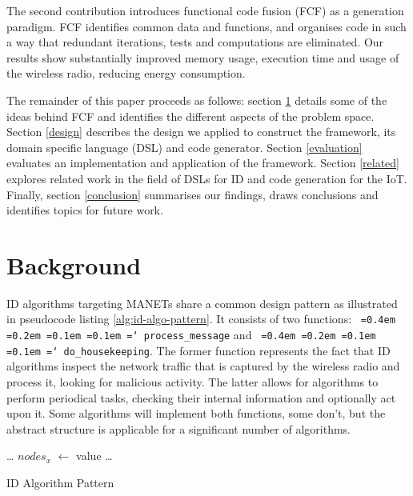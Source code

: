 \documentclass[conference]{IEEEtran}
\newcommand*\justify{%
  \fontdimen2\font=0.4em%
  \fontdimen3\font=0.2em%
  \fontdimen4\font=0.1em%
  \fontdimen7\font=0.1em%
  \hyphenchar\font=`\-%
}
\newcommand{\ttt}[1]{\texttt{\justify{#1}}}
\newcommand*\Let[2]{\State #1 $\gets$ #2}
\let\ForEach\ForAll
\begin{document}

The second contribution introduces functional code fusion (FCF) as a generation
paradigm. FCF identifies common data and functions, and organises code in such
a way that redundant iterations, tests and computations are eliminated. Our
results show substantially improved memory usage, execution time and usage of
the wireless radio, reducing energy consumption.


The remainder of this paper proceeds as follows: section \ref{background}
details some of the ideas behind FCF and identifies the different aspects of
the problem space. Section \ref{design} describes the design we applied to
construct the framework, its domain specific language (DSL) and code generator.
Section \ref{evaluation} evaluates an implementation and application of the
framework. Section \ref{related} explores related work in the field of DSLs for
ID and code generation for the IoT. Finally, section \ref{conclusion}
summarises our findings, draws conclusions and identifies topics for future
work.

\section{Background}
\label{background}

ID algorithms targeting MANETs share a common design pattern as illustrated in
pseudocode listing \ref{alg:id-algo-pattern}. It consists of two functions:
\ttt{process\_message} and \ttt{do\_housekeeping}. The former function
represents the fact that ID algorithms inspect the network traffic that is
captured by the wireless radio and process it, looking for malicious activity.
The latter allows for algorithms to perform periodical tasks, checking their
internal information and optionally act upon it. Some algorithms will implement
both functions, some don't, but the abstract structure is applicable for a
significant number of algorithms.

\begin{listing}
\begin{algorithmic}[1]
    \ForEach{$byte \in msg$} \label{alg:id-algo-pattern-loop1}
     \State \dots {}
    \EndFor
    \Let{$nodes_x$}{value}  
    \State {}  \label{alg:id-algo-pattern-send}
  \EndFunction
  \State
    \ForEach{$node \in nodes$} \label{alg:id-algo-pattern-loop2}
       
        \State \dots {}
      \EndIf
    \EndFor
  \EndFunction
  \State
\end{algorithmic}
\caption{ID Algorithm Pattern\label{alg:id-algo-pattern}}
\end{listing}
\end{document}
